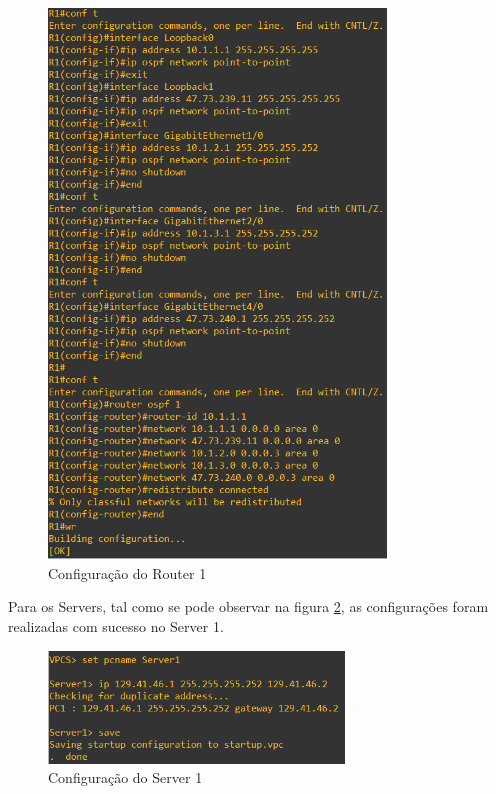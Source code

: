 \documentclass[11pt,english, openright, oneside]{book}
\begin{document}
\begin{figure}[H]
  \centering
  \includegraphics[width=0.80\textwidth]{imagens/Tarefa1/1.configR1.png}
  \caption{Configuração do Router 1}
  \label{fig:config1}
\end{figure}
\vspace{0.2cm}

\newpage
Para os Servers, tal como se pode observar na figura \ref{fig:configServer1}, as configurações foram realizadas com sucesso no Server 1.
\vspace{0.2cm}

\begin{figure}[H]
  \centering
  \includegraphics[width=0.70\textwidth]{imagens/Tarefa1/1.configServer1.png}
  \caption{Configuração do Server 1}
  \label{fig:configServer1}
\end{figure}
\vspace{0.2cm}
\end{document}
